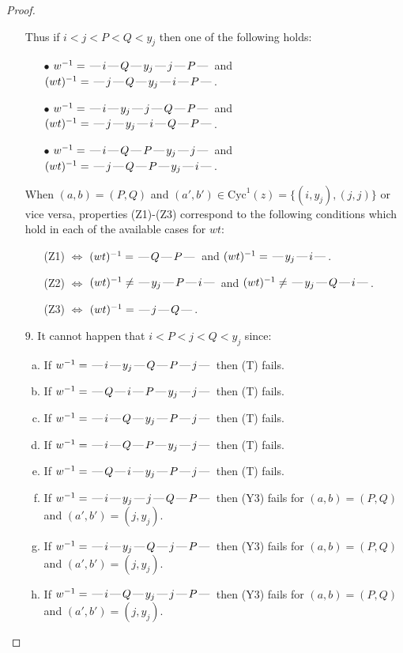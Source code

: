 \documentclass[10pt]{article}
\theoremstyle{definition}
\theoremstyle{definition}
\def\dash{\text{\hspace{0.5mm}---\hspace{0.5mm}}}
\def\Cyc{\mathrm{Cyc}}
\begin{document}
\begin{proof}
\begin{enumerate}
\begin{enumerate}[(a)]
\end{enumerate}
Thus if $i < j < P < Q < y_j$ then one of the following holds:
\begin{enumerate}
\item[$\bullet$] $w^{-1} = \dash i\dash Q\dash y_j\dash j\dash P\dash $ and $(wt)^{-1} = \dash j\dash Q\dash y_j\dash i\dash P\dash $.
\item[$\bullet$] $w^{-1} = \dash i\dash y_j\dash j\dash Q\dash P\dash $ and $(wt)^{-1} = \dash j\dash y_j\dash i\dash Q\dash P\dash $.
\item[$\bullet$] $w^{-1} = \dash i\dash Q\dash P\dash y_j\dash j\dash $ and $(wt)^{-1} = \dash j\dash Q\dash P\dash y_j\dash i\dash $.
\end{enumerate}
When $(a,b)= (P,Q)$ and $(a',b')\in \Cyc^1(z)=\{(i,y_j),(j,j)\}$ or vice versa,
properties (Z1)-(Z3) correspond to the following conditions which
hold in each of the available cases for $wt$:
\begin{enumerate}
\item[](Z1) $\Leftrightarrow$ $(wt)^{-1} = \dash Q \dash P \dash$  and $(wt)^{-1} = \dash y_j \dash i \dash$.
\item[](Z2) $\Leftrightarrow$ $(wt)^{-1} \neq \dash y_j \dash P \dash i \dash$ and $(wt)^{-1}\neq \dash y_j \dash Q \dash i \dash$.
\item[](Z3) $\Leftrightarrow$ $(wt)^{-1} = \dash j \dash Q \dash$.
\end{enumerate}
\item[$9$.] It cannot happen that $i < P < j < Q < y_j$ since:
\begin{enumerate}[(a)]
\item If $w^{-1} = \dash i\dash y_j\dash Q\dash P\dash j\dash $ then (T) fails.
\item If $w^{-1} = \dash Q\dash i\dash P\dash y_j\dash j\dash $ then (T) fails.
\item If $w^{-1} = \dash i\dash Q\dash y_j\dash P\dash j\dash $ then (T) fails.
\item If $w^{-1} = \dash i\dash Q\dash P\dash y_j\dash j\dash $ then (T) fails.
\item If $w^{-1} = \dash Q\dash i\dash y_j\dash P\dash j\dash $ then (T) fails.
\item If $w^{-1} = \dash i\dash y_j\dash j\dash Q\dash P\dash $ then (Y3) fails for $(a,b)=(P,Q)$ and $(a',b')=(j,y_j)$.
\item If $w^{-1} = \dash i\dash y_j\dash Q\dash j\dash P\dash $ then (Y3) fails for $(a,b)=(P,Q)$ and $(a',b')=(j,y_j)$.
\item If $w^{-1} = \dash i\dash Q\dash y_j\dash j\dash P\dash $ then (Y3) fails for $(a,b)=(P,Q)$ and $(a',b')=(j,y_j)$.

\end{enumerate}
\end{enumerate}
\end{proof}
\end{document}
